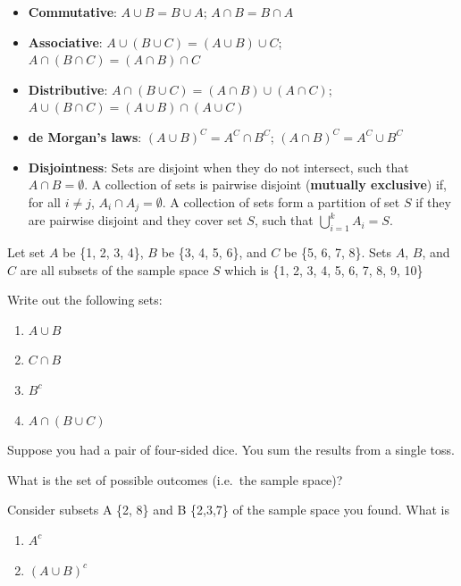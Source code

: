 \documentclass[]{book}
\providecommand{\tightlist}{%
  \setlength{\itemsep}{0pt}\setlength{\parskip}{0pt}}
\theoremstyle{definition}
\theoremstyle{definition}
\theoremstyle{definition}
\theoremstyle{remark}
\let\BeginKnitrBlock\begin \let\EndKnitrBlock\end
\begin{document}
\begin{itemize}
\tightlist
\item
  \textbf{Commutative}: \(A \cup B = B \cup A\); \(A \cap B = B \cap A\)
\item
  \textbf{Associative}: \(A \cup (B \cup C) = (A \cup B) \cup C\); \(A \cap (B \cap C) = (A \cap B) \cap C\)
\item
  \textbf{Distributive}: \(A \cap (B \cup C) = (A \cap B) \cup (A \cap C)\); \(A \cup (B \cap C) = (A \cup B) \cap (A \cup C)\)
\item
  \textbf{de Morgan's laws}: \((A \cup B)^C = A^C \cap B^C\); \((A \cap B)^C = A^C \cup B^C\)
\item
  \textbf{Disjointness}: Sets are disjoint when they do not intersect, such that \(A \cap B = \emptyset\). A collection of sets is pairwise disjoint (\textbf{mutually exclusive}) if, for all \(i \neq j\), \(A_i \cap A_j = \emptyset\). A collection of sets form a partition of set \(S\) if they are pairwise disjoint and they cover set \(S\), such that \(\bigcup_{i = 1}^k A_i = S\).
\end{itemize}

\BeginKnitrBlock{example}[Sets]
\protect\hypertarget{exm:sets}{}{\label{exm:sets} {} }
Let set \(A\) be \{1, 2, 3, 4\}, \(B\) be \{3, 4, 5, 6\}, and \(C\) be \{5, 6, 7, 8\}. Sets \(A\), \(B\), and \(C\) are all subsets of the sample space \(S\) which is \{1, 2, 3, 4, 5, 6, 7, 8, 9, 10\}

Write out the following sets:

\begin{enumerate}
\def\labelenumi{\arabic{enumi}.}
\tightlist
\item
  \(A \cup B\)
\item
  \(C \cap B\)
\item
  \(B^c\)
\item
  \(A \cap (B \cup C)\)
\end{enumerate}
\EndKnitrBlock{example}

\BeginKnitrBlock{exercise}[Sets]
\protect\hypertarget{exr:sets1}{}{\label{exr:sets1} {} }

Suppose you had a pair of four-sided dice. You sum the results from a single toss.

What is the set of possible outcomes (i.e.~the sample space)?

Consider subsets A \{2, 8\} and B \{2,3,7\} of the sample space you found. What is

\begin{enumerate}
\def\labelenumi{\arabic{enumi}.}
\tightlist
\item
  \(A^c\)
\item
  \((A \cup B)^c\)
\end{enumerate}
\EndKnitrBlock{exercise}
\end{document}
